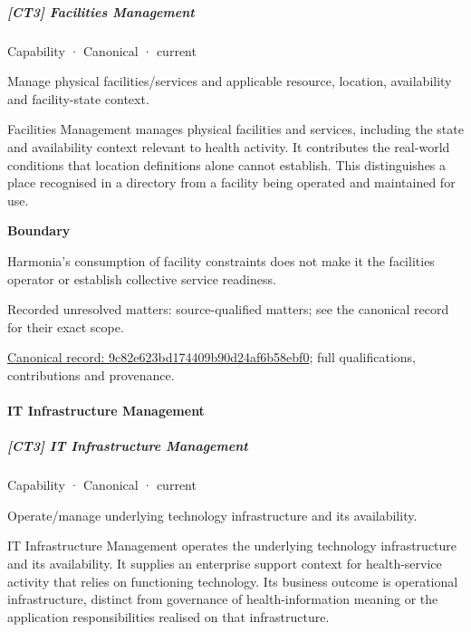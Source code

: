 \subparagraph{[CT3] Facilities Management}

\label{element:9c82e623bd174409b90d24af6b58ebf0}
{\small Capability · Canonical · current}\par

Manage physical facilities/services and applicable resource, location, availability and facility-state context.



Facilities Management manages physical facilities and services, including the state and availability context relevant to health activity. It contributes the real-world conditions that location definitions alone cannot establish. This distinguishes a place recognised in a directory from a facility being operated and maintained for use.



\textbf{Boundary}



Harmonia's consumption of facility constraints does not make it the facilities operator or establish collective service readiness.


{\small Recorded unresolved matters: source-qualified matters; see the canonical record for their exact scope.}\par
{\footnotesize \href{../../../../continuum/strategy/capability/9c82e623bd174409b90d24af6b58ebf0.md}{Canonical record: 9c82e623bd174409b90d24af6b58ebf0}; full qualifications, contributions and provenance.}\par
\paragraph{IT Infrastructure Management}

\subparagraph{[CT3] IT Infrastructure Management}

\label{element:9a37413582314e0dbac006f82900858b}
{\small Capability · Canonical · current}\par

Operate/manage underlying technology infrastructure and its availability.



IT Infrastructure Management operates the underlying technology infrastructure and its availability. It supplies an enterprise support context for health-service activity that relies on functioning technology. Its business outcome is operational infrastructure, distinct from governance of health-information meaning or the application responsibilities realised on that infrastructure.



